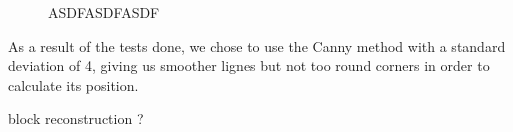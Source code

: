 \begin{figure}[H]
\hfill
{}
\hfill
{}
\hfill
{}
\hfill
{}
\hfill

\caption{ASDFASDFASDF}

\end{figure}




As a result of the tests done, we chose to use the Canny method with a standard deviation of 4, giving us smoother lignes but not too round corners in order to calculate its position.


\begin{flushleft}
 block reconstruction ?
 \end{flushleft}

 